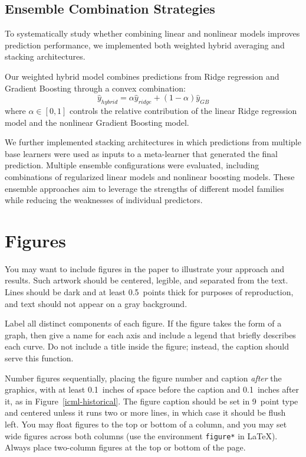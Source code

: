 \documentclass{article}
\begin{document}
\subsection{Ensemble Combination Strategies}

To systematically study whether combining linear and nonlinear models improves prediction performance, we implemented both weighted hybrid averaging and stacking architectures.

Our weighted hybrid model combines predictions from Ridge regression and Gradient Boosting through a convex combination:
\[
\hat y_{hybrid}= \alpha \hat y_{ridge} + (1-\alpha)\hat y_{GB}
\]
where $\alpha \in [0,1]$ controls the relative contribution of the linear Ridge regression model and the nonlinear Gradient Boosting model.

We further implemented stacking architectures in which predictions from multiple base learners were used as inputs to a meta-learner that generated the final prediction. Multiple ensemble configurations were evaluated, including combinations of regularized linear models and nonlinear boosting models. These ensemble approaches aim to leverage the strengths of different model families while reducing the weaknesses of individual predictors.


\section{Figures}

You may want to include figures in the paper to illustrate
your approach and results. Such artwork should be centered,
legible, and separated from the text. Lines should be dark and at
least 0.5~points thick for purposes of reproduction, and text should
not appear on a gray background.

Label all distinct components of each figure. If the figure takes the
form of a graph, then give a name for each axis and include a legend
that briefly describes each curve. Do not include a title inside the
figure; instead, the caption should serve this function.

Number figures sequentially, placing the figure number and caption
\emph{after} the graphics, with at least 0.1~inches of space before
the caption and 0.1~inches after it, as in
Figure~\ref{icml-historical}. The figure caption should be set in
9~point type and centered unless it runs two or more lines, in which
case it should be flush left. You may float figures to the top or
bottom of a column, and you may set wide figures across both columns
(use the environment \texttt{figure*} in \LaTeX). Always place
two-column figures at the top or bottom of the page.
\end{document}
